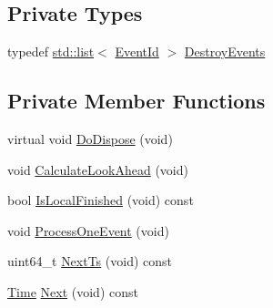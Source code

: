 \subsection*{Private Types}
\begin{DoxyCompactItemize}
\item 
typedef \hyperlink{openflow-interface_8h_afd9bcfa176617760671b67580f536fa7}{std\+::list}$<$ \hyperlink{classns3_1_1EventId}{Event\+Id} $>$ \hyperlink{classns3_1_1DistributedSimulatorImpl_aa24afccd74580b3d5903cc258a51944a}{Destroy\+Events}
\end{DoxyCompactItemize}
\subsection*{Private Member Functions}
\begin{DoxyCompactItemize}
\item 
virtual void \hyperlink{classns3_1_1DistributedSimulatorImpl_ab2244c8d96f23a9d50b98115c917f993}{Do\+Dispose} (void)
\item 
void \hyperlink{classns3_1_1DistributedSimulatorImpl_a9f0890339d4631f5eeda05ac46cc824f}{Calculate\+Look\+Ahead} (void)
\item 
bool \hyperlink{classns3_1_1DistributedSimulatorImpl_ada1dd28c3da4462ea8a2acd60ff5ad96}{Is\+Local\+Finished} (void) const 
\item 
void \hyperlink{classns3_1_1DistributedSimulatorImpl_a56582f58c7b973e24d4c303bfb639f7c}{Process\+One\+Event} (void)
\item 
uint64\+\_\+t \hyperlink{classns3_1_1DistributedSimulatorImpl_a8de6193e6e1d6f6f350bf61e029325d2}{Next\+Ts} (void) const 
\item 
\hyperlink{classns3_1_1Time}{Time} \hyperlink{classns3_1_1DistributedSimulatorImpl_a47bd05a3f2095f0935ef3ed60ceac4dc}{Next} (void) const 
\end{DoxyCompactItemize}
